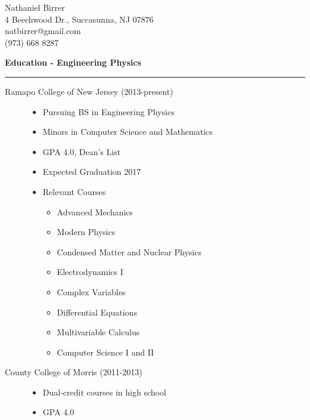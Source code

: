 \documentclass[letterpaper,10pt]{article}
\begin{document}
 \begin{center}
  \Large
  Nathaniel Birrer \\
  \normalsize
  4 Beechwood Dr., Succasunna, NJ 07876 \\
  natbirrer@gmail.com \\
  (973) 668 8287 \\
 \end{center}
 
 \large
 \textbf{Education - Engineering Physics}
 \vspace{1 mm}
 \hrule
 \normalsize
 
 \begin{description}
 
   \item[Ramapo College of New Jersey (2013-present)] \hfill
   \begin{itemize}
    \item Pursuing BS in Engineering Physics
    \item Minors in Computer Science and Mathematics
    \item GPA 4.0, Dean's List
    \item Expected Graduation 2017
    \item Relevant Courses \hfill
     \begin{multicols}{2}
      \begin{itemize}
      \item Advanced Mechanics
      \item Modern Physics
      \item Condensed Matter and Nuclear Physics
      \item Electrodynamics I
      \item Complex Variables
      \item Differential Equations
      \item Multivariable Calculus
      \item Computer Science I and II
      \end{itemize}
     \end{multicols}
   \end{itemize}

   \item[County College of Morris (2011-2013)] \hfill
   \begin{itemize}
    \item Dual-credit courses in high school
    \item GPA 4.0
   \end{itemize}

 \end{description}
 
\end{document}

